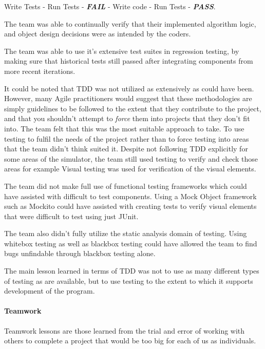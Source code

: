 \documentclass[11pt]{article}
\begin{document}
\begin{enumerate}
	Write Tests - Run Tests - \textbf {\textit{FAIL}} - Write code - Run Tests - \textbf {\textit{PASS}}. 
	
	The team was able to continually verify that their implemented algorithm logic, and object design decisions were as intended by the coders.
	
	The team was able to use it's extensive test suites in regression testing, by making sure that historical tests still passed after integrating components from more recent iterations.
	
	It could be noted that TDD was not utilized as extensively as could have been. However, many Agile practitioners would suggest that these methodologies are simply guidelines to be followed to the extent that they contribute to the project, and that you shouldn't attempt to \textit{force} them into projects that they don't fit into. The team felt that this was the most suitable approach to take. To use testing to fulfil the needs of the project rather than to force testing into areas that the team didn't think suited it. Despite not following TDD explicitly for some areas of the simulator, the team still used testing to verify and check those areas for example Visual testing was used for verification of the visual elements.
	
	The team did not make full use of functional testing frameworks which could have assisted with difficult to test components. Using a Mock Object framework such as Mockito could have assisted with creating tests to verify visual elements that were difficult to test using just JUnit.
	
	The team also didn't fully utilize the static analysis domain of testing. Using whitebox testing as well as blackbox testing could have allowed the team to find bugs unfindable through blackbox testing alone.
	
	The main lesson learned in terms of TDD was not to use as many different types of testing as are available, but to use testing to the extent to which it supports development of the program.
	
	
\end{enumerate}

\paragraph{Teamwork}

Teamwork lessons are those learned from the trial and error of working with others to complete a project that would be too big for each of us as individuals.
\end{document}
